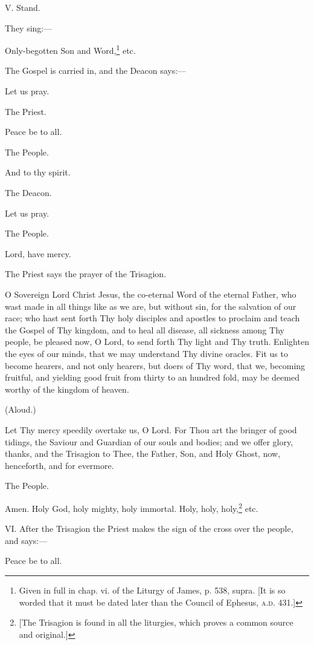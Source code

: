 V. Stand.

They sing:—

Only-begotten Son and Word,\footnote{\par  Given in full in chap. vi. of the Liturgy of James, p. 538, supra. [It is so worded that it must be dated later than the Council of Ephesus, \textsc{a.d.} 431.]} etc.

The Gospel is carried in, and the Deacon says:—

Let us pray.

The Priest.

Peace be to all.

The People.

And to thy spirit.

The Deacon.

Let us pray.

The People.

Lord, have mercy.

The Priest says the prayer of the Trisagion.

O Sovereign Lord Christ Jesus, the co-eternal Word of the eternal Father, who wast made in all things like as we are, but without sin, for the salvation of our race; who hast sent forth Thy holy disciples and apostles to proclaim and teach the Gospel of Thy kingdom, and to heal all disease, all sickness among Thy people, be pleased now, O Lord, to send forth Thy light and Thy truth. Enlighten the eyes of our minds, that we may understand Thy divine oracles. Fit us to become hearers, and not only hearers, but doers of Thy word, that we, becoming fruitful, and yielding good fruit from thirty to an hundred fold, may be deemed worthy of the kingdom of heaven.

(Aloud.)

Let Thy mercy speedily overtake us, O Lord. For Thou art the bringer of good tidings, the Saviour and Guardian of our souls and bodies; and we offer glory, thanks, and the Trisagion to Thee, the Father, Son, and Holy Ghost, now, henceforth, and for evermore.

The People.

Amen. Holy God, holy mighty, holy immortal. Holy, holy, holy,\footnote{\par{}  [The Trisagion is found in all the liturgies, which proves a common source and original.]} etc.

VI. After the Trisagion the Priest makes the sign of the cross over the people, and says:—

Peace be to all.

